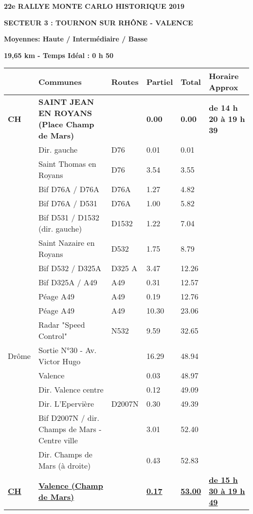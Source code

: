 \documentclass{article}%
\begin{document}
%
\normalsize%
\begin{center} \textbf{\LARGE{22e RALLYE MONTE CARLO HISTORIQUE 2019}} \end{center}%
\begin{flushleft} \textbf{SECTEUR 3 : TOURNON SUR RHÔNE - VALENCE
} \end{flushleft}%
\begin{flushright} \textbf{             Moyennes: Haute / Intermédiaire / Basse
} \end{flushright}%
\begin{flushright} \textbf{19,65 km - Temps Idéal : 0 h 50
} \end{flushright}%
\begin{longtable}{p{2.25cm}|p{6.7cm}|p{2.0cm}|p{1.5cm}|p{1.5cm}|p{3.5cm}}%
\hline%
&Communes&Routes&Partiel&Total&Horaire Approx\\%
\hline%
\endhead%
\endfoot%
\endlastfoot%
\textbf{﻿CH}&\textbf{SAINT JEAN EN ROYANS (Place Champ de Mars)}& &\textbf{0.00}&\textbf{0.00}&\textbf{de 14 h 20 à 19 h 39}\\%
 &Dir. gauche&D76&0.01&0.01& \\%
 &Saint Thomas en Royans&D76 &3.54&3.55& \\%
 &Bif D76A / D76A&D76A&1.27&4.82& \\%
 &Bif D76A / D531&D76A&1.00&5.82& \\%
 &Bif D531 / D1532 (dir. gauche)&D1532&1.22&7.04& \\%
 &Saint Nazaire en Royans&D532&1.75&8.79& \\%
 &Bif D532 / D325A&D325 A&3.47&12.26& \\%
 &Bif D325A / A49&A49&0.31&12.57& \\%
 &Péage A49&A49&0.19&12.76& \\%
 &Péage A49&A49&10.30&23.06& \\%
 &Radar "Speed Control"&N532&9.59&32.65& \\%
Drôme&Sortie N°30 - Av. Victor Hugo& &16.29&48.94& \\%
 &Valence & &0.03&48.97& \\%
 &Dir. Valence centre& &0.12&49.09& \\%
 &Dir. L'Epervière &D2007N&0.30&49.39& \\%
 &Bif D2007N / dir. Champs de Mars - Centre ville& &3.01&52.40& \\%
 &Dir. Champs de Mars (à droite)& &0.43&52.83& \\%
\textbf{\underline{CH}}&\textbf{\underline{Valence (Champ de Mars)}}& &\textbf{\underline{0.17}}&\textbf{\underline{53.00}}&\textbf{\underline{de 15 h 30 à 19 h 49}}\\%
\hline%
\end{longtable}%
\end{document}
